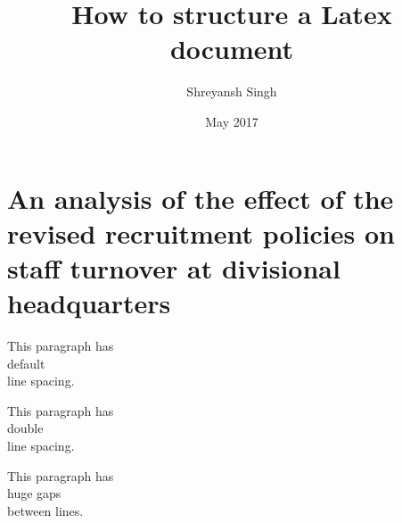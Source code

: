 \documentclass[11pt,a4paper]{report}
\begin{document}
	\title{How to structure a Latex document}
	\author{Shreyansh Singh}
	\newcommand{\latex}{\LaTeX\xspace}
	\date{May 2017}
	\maketitle
	\tableofcontents
	\newpage
	\section[Effect on staff turnover]{An analysis of the
		effect of the revised recruitment policies on staff
		turnover at divisional headquarters}
	
	This paragraph has \\ default \\ line spacing.
	
	\begin{doublespace}
		This paragraph has \\ double \\ line spacing.
	\end{doublespace}
	
	\begin{spacing}{2.5}
		This paragraph has \\ huge gaps \\ between lines.
	\end{spacing}
\end{document}
